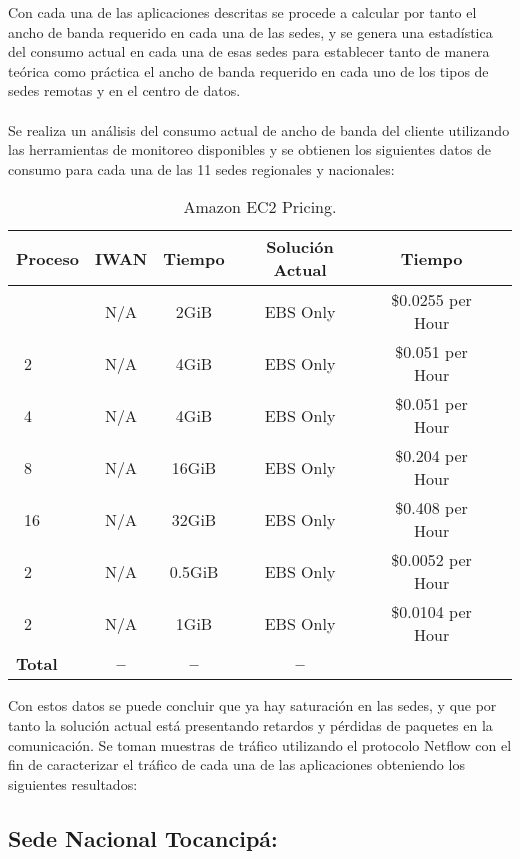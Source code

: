 Con cada una de las aplicaciones descritas se procede a calcular por tanto el ancho de banda requerido en cada una de las sedes, y se genera una estadística del consumo actual en cada una de esas sedes para establecer tanto de manera teórica como práctica el ancho de banda requerido en cada uno de los tipos de sedes remotas y en el centro de datos.
\\
\\
Se realiza un análisis del consumo actual de ancho de banda del cliente utilizando las herramientas de monitoreo disponibles y se obtienen los siguientes datos de consumo para cada una de las 11 sedes regionales y nacionales:
\begin{table}[ht]
	\caption{Amazon EC2 Pricing.}
	\label{tab:hla:results}
\centering
\begin{tabular}{lccccc}
	\toprule
	\multicolumn{1}{c}{\textbf{Proceso}} 	& \textbf{IWAN}	& \textbf{Tiempo}	& \textbf{Solución Actual}
	& \textbf{Tiempo}\\
	\midrule
\cite{Aprovisionamiento tienda nueva} 		& N/A & 2GiB & EBS Only	& \$0.0255 per Hour \\
\cite{a1.large}~2 		& N/A & 4GiB & EBS Only & \$0.051 per Hour	\\
\cite{a1.xlarge}~4		& N/A & 4GiB & EBS Only & \$0.051 per Hour	\\
\cite{a1.2xlarge}~8 	& N/A & 16GiB & EBS Only & \$0.204 per Hour	\\
\cite{a1.4xlarge}~16	& N/A & 32GiB & EBS Only & \$0.408 per Hour	\\
\cite{t3.nano}~2		& N/A & 0.5GiB & EBS Only & \$0.0052 per Hour	\\
\cite{t3.micro}~2   	& N/A & 1GiB & EBS Only & \$0.0104 per Hour	\\
	\midrule
	\textbf{Total}			& \textbf{--}		& \textbf{--}		& \textbf{--} \\
	\bottomrule
\end{tabular}
\end{table}

Con estos datos se puede concluir que ya hay saturación en las sedes, y que por tanto la solución actual está presentando retardos y pérdidas de paquetes en la comunicación.
Se toman muestras de tráfico utilizando el protocolo Netflow con el fin de caracterizar el tráfico de cada una de las aplicaciones obteniendo los siguientes resultados:

\subsection{Sede Nacional Tocancipá:} %
\label{sec:Sede Nacional Tocancipá:}

